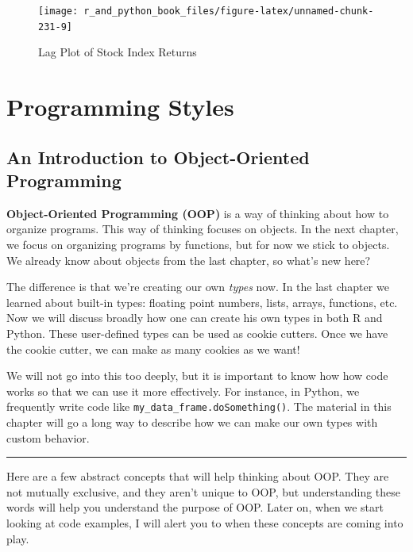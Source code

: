 \documentclass[
  12pt,
  krantz2]{krantz}
\begin{document}
\begin{figure}
\texttt{[image: r\_and\_python\_book\_files/figure-latex/unnamed-chunk-231-9]} \caption{Lag Plot of Stock Index Returns}\label{fig:unnamed-chunk-231}
\end{figure}

\hypertarget{part-programming-styles}{%
\part{Programming Styles}\label{part-programming-styles}}

\hypertarget{an-introduction-to-object-oriented-programming}{%
\chapter{An Introduction to Object-Oriented Programming}\label{an-introduction-to-object-oriented-programming}}

\textbf{Object-Oriented Programming (OOP)} is a way of thinking about how to organize programs. This way of thinking focuses on objects. In the next chapter, we focus on organizing programs by functions, but for now we stick to objects. We already know about objects from the last chapter, so what's new here?

The difference is that we're creating our own \emph{types} now. In the last chapter we learned about built-in types: floating point numbers, lists, arrays, functions, etc. Now we will discuss broadly how one can create his own types in both R and Python. These user-defined types can be used as cookie cutters. Once we have the cookie cutter, we can make as many cookies as we want!

We will not go into this too deeply, but it is important to know how how code works so that we can use it more effectively. For instance, in Python, we frequently write code like \texttt{my\_data\_frame.doSomething()}. The material in this chapter will go a long way to describe how we can make our own types with custom behavior.

\begin{center}\rule{0.5\linewidth}{0.5pt}\end{center}

Here are a few abstract concepts that will help thinking about OOP. They are not mutually exclusive, and they aren't unique to OOP, but understanding these words will help you understand the purpose of OOP. Later on, when we start looking at code examples, I will alert you to when these concepts are coming into play.
\end{document}
